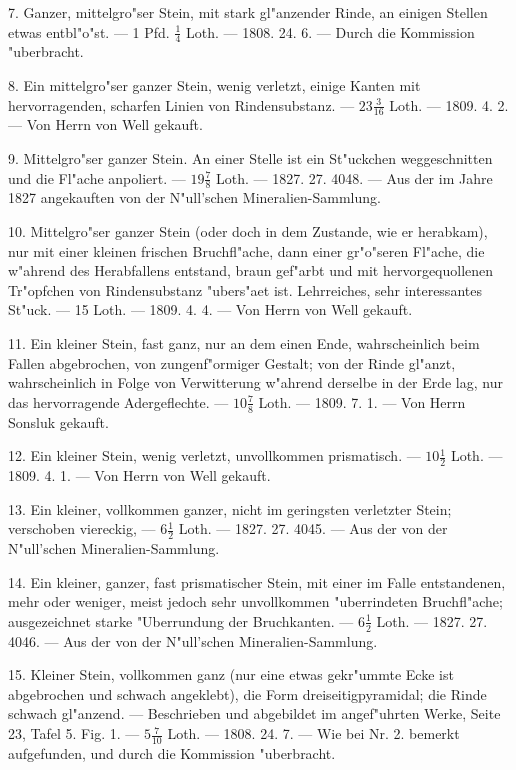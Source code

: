 \documentclass[a4paper, 11pt, oneside, polutonikogreek, german]{article}
\begin{document}
7. Ganzer, mittelgro"ser Stein, mit stark gl"anzender Rinde, an einigen Stellen etwas entbl"o"st. --- 1 Pfd. $\frac{1}{4}$ Loth. --- 1808. 24. 6. --- Durch die Kommission "uberbracht.

8. Ein mittelgro"ser ganzer Stein, wenig verletzt, einige Kanten mit hervorragenden, scharfen Linien von Rindensubstanz. --- $23\frac{3}{16}$ Loth. --- 1809. 4. 2. --- Von Herrn von Well gekauft.

9. Mittelgro"ser ganzer Stein. An einer Stelle ist ein St"uckchen weggeschnitten und die Fl"ache anpoliert. --- $19\frac{7}{8}$ Loth. --- 1827. 27. 4048. --- Aus der im Jahre 1827 angekauften von der N"ull’schen Mineralien-Sammlung.

10. Mittelgro"ser ganzer Stein (oder doch in dem Zustande, wie er herabkam), nur mit einer kleinen frischen Bruchfl"ache, dann einer gr"o"seren Fl"ache, die w"ahrend des Herabfallens entstand, braun gef"arbt und mit hervorgequollenen Tr"opfchen von Rindensubstanz "ubers"aet ist. Lehrreiches, sehr interessantes St"uck. --- 15 Loth. --- 1809. 4. 4. --- Von Herrn von Well gekauft.

11. Ein kleiner Stein, fast ganz, nur an dem einen Ende, wahrscheinlich beim Fallen abgebrochen, von zungenf"ormiger Gestalt; von der Rinde gl"anzt, wahrscheinlich in Folge von Verwitterung w"ahrend derselbe in der Erde lag, nur das hervorragende Adergeflechte. --- $10\frac{7}{8}$ Loth. --- 1809. 7. 1. --- Von Herrn Sonsluk gekauft.

12. Ein kleiner Stein, wenig verletzt, unvollkommen prismatisch. --- $10\frac{1}{2}$ Loth. --- 1809. 4. 1. --- Von Herrn von Well gekauft.

13. Ein kleiner, vollkommen ganzer, nicht im geringsten verletzter Stein; verschoben viereckig, --- $6\frac{1}{2}$ Loth. --- 1827. 27. 4045. --- Aus der von der N"ull’schen Mineralien-Sammlung.

14. Ein kleiner, ganzer, fast prismatischer Stein, mit einer im Falle entstandenen, mehr oder weniger, meist jedoch sehr unvollkommen "uberrindeten Bruchfl"ache; ausgezeichnet starke "Uberrundung der Bruchkanten. --- $6\frac{1}{2}$ Loth. --- 1827. 27. 4046. --- Aus der von der N"ull’schen Mineralien-Sammlung.

15. Kleiner Stein, vollkommen ganz (nur eine etwas gekr"ummte Ecke ist abgebrochen und schwach angeklebt), die Form dreiseitigpyramidal; die Rinde schwach gl"anzend. --- Beschrieben und abgebildet im angef"uhrten Werke, Seite 23, Tafel 5. Fig. 1. --- $5\frac{7}{10}$ Loth. --- 1808. 24. 7. --- Wie bei Nr. 2. bemerkt aufgefunden, und durch die Kommission "uberbracht.
\end{document}
